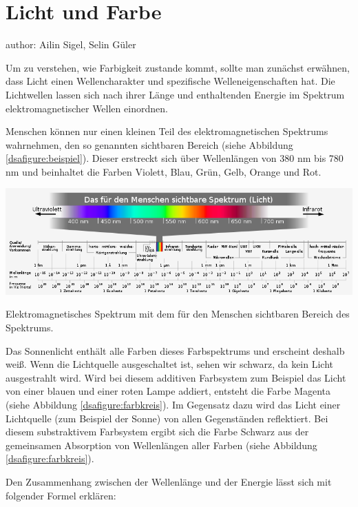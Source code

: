 \section{Licht und Farbe}

author: Ailin Sigel, Selin Güler

Um zu verstehen, wie Farbigkeit zustande kommt, sollte man zunächst erwähnen, dass Licht einen Wellencharakter und spezifische Welleneigenschaften hat. Die Lichtwellen lassen sich nach ihrer Länge und  enthaltenden Energie im Spektrum elektromagnetischer Wellen einordnen.

Menschen können nur einen kleinen Teil des elektromagnetischen Spektrums wahrnehmen, den so genannten sichtbaren Bereich (siehe Abbildung \ref{dsafigure:beispiel}). Dieser erstreckt sich über Wellenlängen von 380 nm bis 780 nm und beinhaltet die Farben Violett, Blau, Grün, Gelb, Orange und Rot. 

\begin{dsafigure}
 \centering
 \includegraphics[width=\columnwidth]{pics/elektromagnetisches_Spektrum.png}
 \caption{Elektromagnetisches Spektrum mit dem für den Menschen sichtbaren Bereich des Spektrums.  \cite{elektromagnetisches_Spektrum}}
 \label{dsafigure:beispiel}
\end{dsafigure}

Das Sonnenlicht enthält alle Farben dieses Farbspektrums und erscheint deshalb weiß. Wenn die Lichtquelle ausgeschaltet ist, sehen wir schwarz, da kein Licht ausgestrahlt wird. Wird bei diesem additiven Farbsystem zum Beispiel das Licht von einer blauen und einer roten Lampe addiert, entsteht die Farbe Magenta (siehe Abbildung \ref{dsafigure:farbkreis}). Im Gegensatz dazu wird das Licht einer Lichtquelle (zum Beispiel der Sonne) von allen Gegenständen reflektiert. 
Bei diesem substraktivem Farbsystem ergibt sich die Farbe Schwarz aus der gemeinsamen Absorption von Wellenlängen aller Farben (siehe Abbildung \ref{dsafigure:farbkreis}).

Den Zusammenhang zwischen der Wellenlänge und der Energie lässt sich mit folgender Formel erklären:

